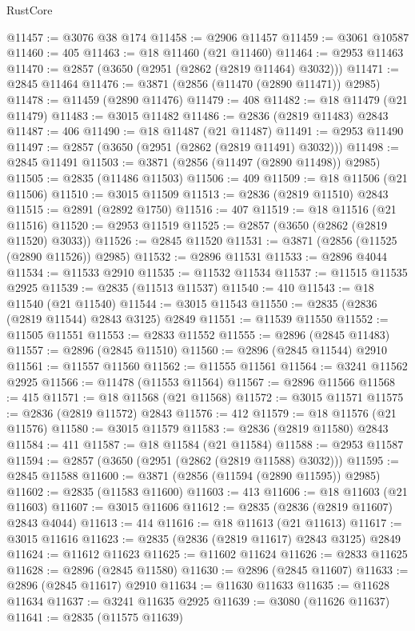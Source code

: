 \begin{lexlean}{RustCore}
\begin{coremodule}
@11457 := @3076 @38 @174
@11458 := @2906 @11457
@11459 := @3061 @10587
@11460 := 405
@11463 := @18 @11460 (@21 @11460)
@11464 := @2953 @11463
@11470 := @2857 (@3650 (@2951 (@2862 (@2819 @11464) @3032)))
@11471 := @2845 @11464
@11476 := @3871 (@2856 (@11470 (@2890 @11471)) @2985)
@11478 := @11459 (@2890 @11476)
@11479 := 408
@11482 := @18 @11479 (@21 @11479)
@11483 := @3015 @11482
@11486 := @2836 (@2819 @11483) @2843
@11487 := 406
@11490 := @18 @11487 (@21 @11487)
@11491 := @2953 @11490
@11497 := @2857 (@3650 (@2951 (@2862 (@2819 @11491) @3032)))
@11498 := @2845 @11491
@11503 := @3871 (@2856 (@11497 (@2890 @11498)) @2985)
@11505 := @2835 (@11486 @11503)
@11506 := 409
@11509 := @18 @11506 (@21 @11506)
@11510 := @3015 @11509
@11513 := @2836 (@2819 @11510) @2843
@11515 := @2891 (@2892 @1750)
@11516 := 407
@11519 := @18 @11516 (@21 @11516)
@11520 := @2953 @11519
@11525 := @2857 (@3650 (@2862 (@2819 @11520) @3033))
@11526 := @2845 @11520
@11531 := @3871 (@2856 (@11525 (@2890 @11526)) @2985)
@11532 := @2896 @11531
@11533 := @2896 @4044
@11534 := @11533 @2910
@11535 := @11532 @11534
@11537 := @11515 @11535 @2925
@11539 := @2835 (@11513 @11537)
@11540 := 410
@11543 := @18 @11540 (@21 @11540)
@11544 := @3015 @11543
@11550 := @2835 (@2836 (@2819 @11544) @2843 @3125) @2849
@11551 := @11539 @11550
@11552 := @11505 @11551
@11553 := @2833 @11552
@11555 := @2896 (@2845 @11483)
@11557 := @2896 (@2845 @11510)
@11560 := @2896 (@2845 @11544) @2910
@11561 := @11557 @11560
@11562 := @11555 @11561
@11564 := @3241 @11562 @2925
@11566 := @11478 (@11553 @11564)
@11567 := @2896 @11566
@11568 := 415
@11571 := @18 @11568 (@21 @11568)
@11572 := @3015 @11571
@11575 := @2836 (@2819 @11572) @2843
@11576 := 412
@11579 := @18 @11576 (@21 @11576)
@11580 := @3015 @11579
@11583 := @2836 (@2819 @11580) @2843
@11584 := 411
@11587 := @18 @11584 (@21 @11584)
@11588 := @2953 @11587
@11594 := @2857 (@3650 (@2951 (@2862 (@2819 @11588) @3032)))
@11595 := @2845 @11588
@11600 := @3871 (@2856 (@11594 (@2890 @11595)) @2985)
@11602 := @2835 (@11583 @11600)
@11603 := 413
@11606 := @18 @11603 (@21 @11603)
@11607 := @3015 @11606
@11612 := @2835 (@2836 (@2819 @11607) @2843 @4044)
@11613 := 414
@11616 := @18 @11613 (@21 @11613)
@11617 := @3015 @11616
@11623 := @2835 (@2836 (@2819 @11617) @2843 @3125) @2849
@11624 := @11612 @11623
@11625 := @11602 @11624
@11626 := @2833 @11625
@11628 := @2896 (@2845 @11580)
@11630 := @2896 (@2845 @11607)
@11633 := @2896 (@2845 @11617) @2910
@11634 := @11630 @11633
@11635 := @11628 @11634
@11637 := @3241 @11635 @2925
@11639 := @3080 (@11626 @11637)
@11641 := @2835 (@11575 @11639)

\end{coremodule}
\end{lexlean}
